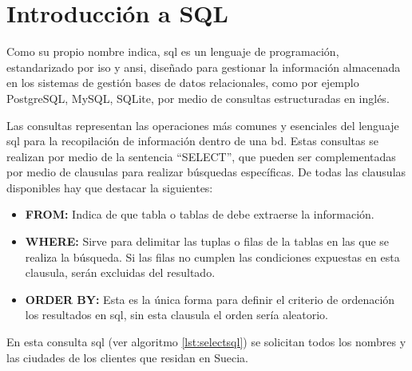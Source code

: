 \section{Introducción a SQL}

Como su propio nombre indica, \acrfull{sql} es un lenguaje de programación, estandarizado por \acrshort{iso}\cite{ISO} y \acrshort{ansi}\cite{ANSI}, diseñado para gestionar la información almacenada en los sistemas de gestión bases de datos relacionales, como por ejemplo PostgreSQL\cite{PostgreSQL}, MySQL\cite{MySQL}, SQLite\cite{SQLite}, por medio de consultas estructuradas en inglés.

Las consultas representan las operaciones más comunes y esenciales del lenguaje \acrshort{sql} para la recopilación de información dentro de una \acrshort{bd}. Estas consultas se realizan por medio de la sentencia ``SELECT'', que pueden ser complementadas por medio de clausulas para realizar búsquedas específicas. De todas las clausulas disponibles hay que destacar la siguientes:

\begin{itemize}
	\item \textbf{FROM:} Indica de que tabla o tablas de debe extraerse la información.
	\item \textbf{WHERE:} Sirve para delimitar las tuplas o filas de la tablas en las que se realiza la búsqueda. Si las filas no cumplen las condiciones expuestas en esta clausula, serán excluidas del resultado.
	\item \textbf{ORDER BY:} Esta es la única forma para definir el criterio de ordenación los resultados en \acrshort{sql}, sin esta clausula el orden sería aleatorio.
\end{itemize}



En esta consulta \acrshort{sql} (ver algoritmo \ref{lst:selectsql}) se solicitan todos los nombres y las ciudades de los clientes que residan en Suecia.